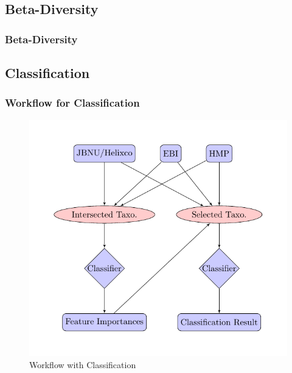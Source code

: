 \documentclass{beamer}
\begin{document}
    \subsection{Beta-Diversity}
    \begin{frame}
        \frametitle{Beta-Diversity}
    \end{frame}

    \subsection{Classification}
    \begin{frame}
        \frametitle{Workflow for Classification}

        \begin{figure}[h!]
            \includegraphics[width=0.5 \linewidth]{figures/tikz/classification.pdf}
            \caption{Workflow with Classification}
        \end{figure}
    \end{frame}
\end{document}
